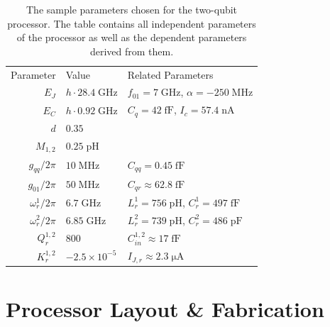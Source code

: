 \begin{table}
	\centering
	\begin{tabularx}{\textwidth}{r|X|l}
	Parameter & Value & Related Parameters \\ [0.3cm]
	$E_J$ & $h\cdot 28.4\;\mathrm{GHz}$ & $f_{01}=7\;\mathrm{GHz}$, $\alpha=-250\;\mathrm{MHz}$ \\ [0.3cm]
	$E_C$ & $h\cdot 0.92\;\mathrm{GHz}$ & $C_q = 42\;\mathrm{fF}$, $I_c = 57.4 \;\mathrm{nA}$\\ [0.3cm]
	$d$ & $0.35$ & \\ [0.3cm]
	$M_{1,2}$ & $0.25\;\mathrm{pH}$ & \\ [0.3cm]
	$g_{qq}/2\pi$  & $10\;\mathrm{MHz}$ & $C_{qq}=0.45\;\mathrm{fF}$ \\ [0.3cm]
	$g_{01}/2\pi$  & $50\;\mathrm{MHz}$ & $C_{qr}\approx 62.8 \;\mathrm{fF}$ \\ [0.3cm]
	$\omega_r^{1}/2\pi$ & $6.7\;\mathrm{GHz}$ & $L_r^1 = 756\;\mathrm{pH}$, $C_r^1= 497 \;\mathrm{fF}$ \\ [0.3cm]
	$\omega_r^{2}/2\pi$ & $6.85\;\mathrm{GHz}$ & $L_r^2 = 739\;\mathrm{pH}$, $C_r^2= 486 \;\mathrm{pF}$\\ [0.3cm]
	$Q_r^{1,2}$ & $800$ & $C_{in}^{1,2}\approx 17 \;\mathrm{fF}$ \\ [0.3cm]
	$K_r^{1,2}$ & $-2.5\times 10^{-5}$ & $I_{J,r}\approx 2.3 \;\mathrm{\mu A}$ \\ [0.3cm] 
	\end{tabularx}
	\caption[]{The sample parameters chosen for the two-qubit processor. The table contains all independent parameters of the processor as well as the dependent parameters derived from them.}
	\label{table:processor_parameters}
\end{table}

\section{Processor Layout \& Fabrication}

